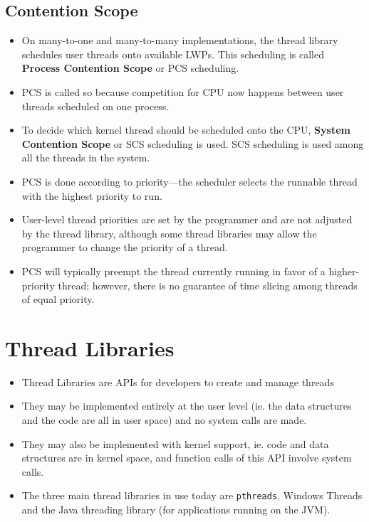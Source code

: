 \documentclass{article}
\theoremstyle{plain}
\theoremstyle{definition}
\begin{document}
\subsection{Contention Scope}
\begin{itemize}
    \item On many-to-one and many-to-many implementations, the thread library schedules user threads onto available LWPs. This scheduling is called \textbf{Process Contention Scope} or PCS scheduling. 
    
    \item PCS is called so because competition for CPU now happens between user threads scheduled on one process.
    
    \item To decide which kernel thread should be scheduled onto the CPU, \textbf{System Contention Scope} or SCS scheduling is used. SCS scheduling is used among all the threads in the system. 
    
    \item PCS is done according to priority—the scheduler selects the runnable thread with the highest priority to run. 
    
    \item User-level thread priorities are set by the programmer and are not adjusted by the thread library, although some thread libraries may allow the programmer to change the priority of a thread. 
    
    \item PCS will typically preempt the thread currently running in favor of a higher-priority thread; however, there is no guarantee of time slicing among threads of equal priority.
\end{itemize}

\section{Thread Libraries}
\begin{itemize}
    \item Thread Libraries are APIs for developers to create and manage threads
    
    \item They may be implemented entirely at the user level (ie. the data structures and the code are all in user space) and no system calls are made.
    
    \item They may also be implemented with kernel support, ie. code and data structures are in kernel space, and function calls of this API involve system calls.
    
    \item The three main thread libraries in use today are \texttt{pthreads}, Windows Threads and the Java threading library (for applications running on the JVM). 
\end{itemize}
\end{document}
